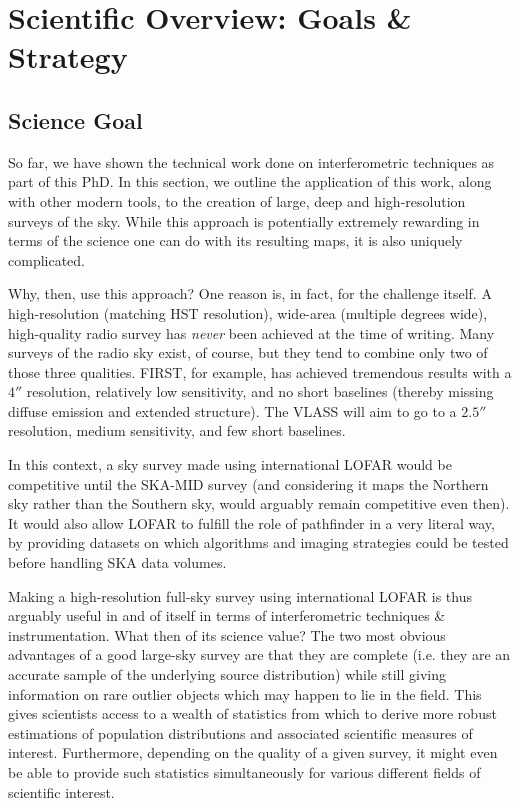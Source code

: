 \chapter{Scientific Overview: Goals \& Strategy}
\minitoc

\section{Science Goal}
\pg
So far, we have shown the technical work done on interferometric techniques as part of this PhD. In this section, we outline the application of this work, along with other modern tools, to the creation of large, deep and high-resolution surveys of the sky. While this approach is potentially extremely rewarding in terms of the science one can do with its resulting maps, it is also uniquely complicated.

\pg
Why, then, use this approach? One reason is, in fact, for the challenge itself. A high-resolution (matching HST resolution), wide-area (multiple degrees wide), high-quality radio survey has \emph{never} been achieved at the time of writing. Many surveys of the radio sky exist, of course, but they tend to combine only two of those three qualities. FIRST, for example, has achieved tremendous results with a $4''$ resolution, relatively low sensitivity, and no short baselines (thereby missing diffuse emission and extended structure). The VLASS  will aim to go to a $2.5''$ resolution, medium sensitivity, and few short baselines. %

\pg
In this context, a sky survey made using international LOFAR would be competitive until the SKA-MID survey (and considering it maps the Northern sky rather than the Southern sky, would arguably remain competitive even then). It would also allow LOFAR to fulfill the role of pathfinder in a very literal way, by providing datasets on which algorithms and imaging strategies could be tested before handling SKA data volumes.

\pg
Making a high-resolution full-sky survey using international LOFAR is thus arguably useful in and of itself in terms of interferometric techniques \& instrumentation. What then of its science value? The two most obvious advantages of a good large-sky survey are that they are complete (i.e. they are an accurate sample of the underlying source distribution) while still giving information on rare outlier objects which may happen to lie in the field. This gives scientists access to a wealth of statistics from which to derive more robust estimations of population distributions and associated scientific measures of interest. Furthermore, depending on the quality of a given survey, it might even be able to provide such statistics simultaneously for various different fields of scientific interest.

